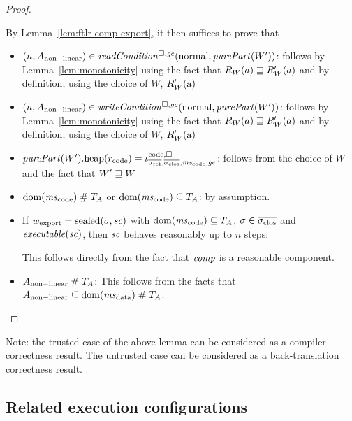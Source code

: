 \documentclass[a4paper]{article}
\begin{document}
\begin{proof}
\begin{itemize}
    By Lemma~\ref{lem:ftlr-comp-export}, it then suffices to prove that
    \begin{itemize}
    \item $\npair{A_{\mathrm{non-linear}}} \in \readCond{}(\normal,\purePart{W'})$: follows by Lemma~\ref{lem:monotonicity} using the fact that $R_W(a) \sqsupseteq R_W'(a)$ and by definition, using the choice of $W$, $R_W'(\mathrm{a})$ 
    \item $\npair{A_{\mathrm{non-linear}}} \in \writeCond{}(\normal,\purePart{W'})$: follows by Lemma~\ref{lem:monotonicity} using the fact that $R_W(a) \sqsupseteq R_W'(a)$ and by definition, using the choice of $W$, $R_W'(\mathrm{a})$ 
    \item $\pwheap[\purePart{W'}](r_{\mathrm{code}}) = \codereg{\sigrets,\sigcloss,\mscode,\gc}$: follows from the choice of $W$ and the fact that $W' \sqsupseteq W$
    \item $\dom(\mscode) \mathrel{\#} \ta$ or $\dom(\mscode) \subseteq \ta$: by assumption.
    \item If $w_{\mathrm{export}} = \mathrm{sealed}(\sigma,\mathit{sc})$ with $\dom(\mscode) \subseteq \ta$, $\sigma \in \sigcloss$ and $\exec{\vsc}$, then $\mathit{sc}$ behaves reasonably up to $n$ steps:

      This follows directly from the fact that $\mathit{comp}$ is a reasonable component.

    \item $A_{\mathrm{non-linear}}\mathrel{\#} T_{A}$:
      This follows from the facts that $A_{\mathrm{non-linear}}\subseteq \dom(\msdata) \mathrel{\#} \ta$.
    \end{itemize}
  \end{itemize}
\end{proof}

Note: the trusted case of the above lemma can be considered as a compiler correctness result.
The untrusted case can be considered as a back-translation correctness result.

\subsection{Related execution configurations}
\label{sec:related-exec-confs}
\end{document}
